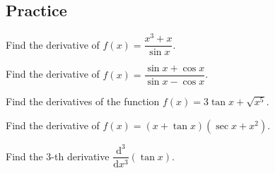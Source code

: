 \subsection{Practice}

\begin{exercise}

  Find the derivative of \(f(x)=\dfrac{x^3+x}{\sin x}\).
  
  \end{exercise}
  \vspace*{6\baselineskip}
  
\begin{exercise}

Find the derivative of \(f(x)=\dfrac{\sin x+\cos x}{\sin x-\cos x}\).

\end{exercise}
\vspace*{6\baselineskip}

\begin{exercise}

Find the derivatives of the function \(f(x)=3\tan x+\sqrt{x^5}\).

\end{exercise}
\vspace*{6\baselineskip}

\begin{exercise}

Find the derivative of \(f(x)=(x+\tan x)(\sec x + x^2)\).

\end{exercise}
\vspace*{6\baselineskip}

\begin{exercise}

Find the 3-th derivative
\(\dfrac{\mathrm{d}^{3}}{\mathrm{d}x^{3}}(\tan x)\).

\end{exercise}
\vspace*{6\baselineskip}

